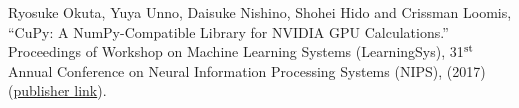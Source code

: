 \documentclass{webofc}
\begin{document}
\begin{thebibliography}{8}
 Ryosuke Okuta, Yuya Unno, Daisuke Nishino, Shohei Hido and Crissman Loomis, ``CuPy: A NumPy-Compatible Library for NVIDIA GPU Calculations.'' Proceedings of Workshop on Machine Learning Systems (LearningSys), 31$^{\mbox{\scriptsize st}}$ Annual Conference on Neural Information Processing Systems (NIPS), (2017) (\textcolor{blue}{\href{http://learningsys.org/nips17/assets/papers/paper_16.pdf}{publisher link}}).

\end{thebibliography}
\end{document}
